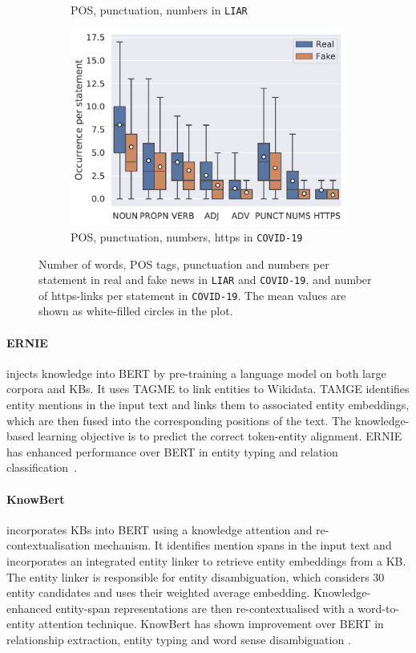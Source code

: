 \documentclass[letterpaper]{article} %
\begin{document}
\begin{figure}
{\begin{subfigure}[b]{0.345\textwidth}
\caption{POS, punctuation, numbers in \texttt{LIAR}}
\label{fig:liarPos}
\end{subfigure}
\hfill
\begin{subfigure}[b]{0.38\textwidth}
\centering
\includegraphics[width=\textwidth]{imgs/covid_plot.pdf}
\caption{POS, punctuation, numbers, https in \texttt{COVID-19}}
\label{fig:covidPos}
\end{subfigure}
}
\caption{Number of words, POS tags, punctuation and numbers per statement in real and fake news in \texttt{LIAR} and \texttt{COVID-19}, and
number of https-links per statement in \texttt{COVID-19}.
The mean values are shown as white-filled circles in the plot.}
\label{fig:box_plot}
\end{figure}


\paragraph{ERNIE} injects knowledge into BERT \cite{devlin-etal-2019-bert} by pre-training a language model on both large corpora and KBs.
It uses TAGME \cite{Ferragina2010TAGMEOA} to link entities to Wikidata.
TAMGE identifies entity mentions in the input text and links them to associated entity embeddings, which are then fused into the corresponding positions of the text.
The knowledge-based learning objective is to predict the correct token-entity alignment.
ERNIE has enhanced performance over BERT in entity typing and relation classification~\cite{zhang-etal-2019-ernie}.

\paragraph{KnowBert} incorporates KBs into BERT using a knowledge attention and re-contextualisation mechanism.
It identifies mention spans in the input text and incorporates an integrated entity linker to retrieve entity embeddings from a KB.
The entity linker is responsible for entity disambiguation, which considers 30 entity candidates and uses their weighted average embedding.
Knowledge-enhanced entity-span representations are then re-contextualised with a word-to-entity attention technique.
KnowBert has shown improvement over BERT in relationship extraction, entity typing and word sense disambiguation \cite{peters-etal-2019-knowledge}.
\end{document}
